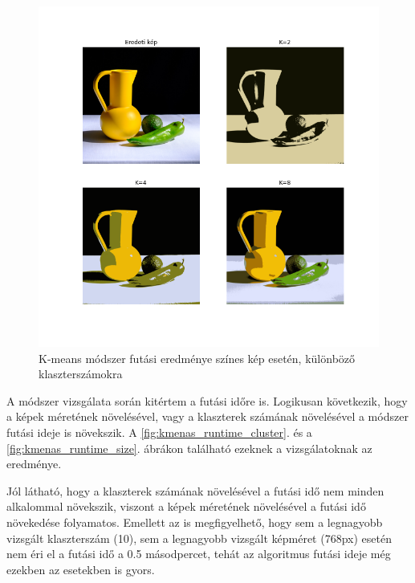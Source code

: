 \begin{figure}[h]
\centering
\includegraphics[scale=0.6]{images/kmeans_rgb.png}
\caption{K-means módszer futási eredménye színes kép esetén, különböző klaszterszámokra}
\label{fig:kmenas_rgb}
\end{figure}

A módszer vizsgálata során kitértem a futási időre is. Logikusan következik, hogy a képek méretének növelésével, vagy a klaszterek számának növelésével a módszer futási ideje is növekszik. A \ref{fig:kmenas_runtime_cluster}. és a \ref{fig:kmenas_runtime_size}. ábrákon található ezeknek a vizsgálatoknak az eredménye.

Jól látható, hogy a klaszterek számának növelésével a futási idő nem minden alkalommal növekszik, viszont a képek méretének növelésével a futási idő növekedése folyamatos. Emellett az is megfigyelhető, hogy sem a legnagyobb vizsgált klaszterszám (10), sem a legnagyobb vizsgált képméret (768px) esetén nem éri el a futási idő a 0.5 másodpercet, tehát az algoritmus futási ideje még ezekben az esetekben is gyors.

